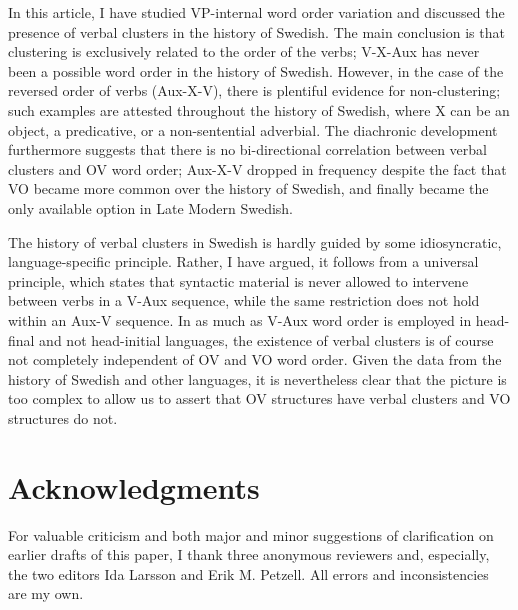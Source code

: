 \documentclass[output=paper, colorlinks, citecolor=brown]{langscibook}
\begin{document}
In this article, I have studied VP-internal word order variation and discussed the presence of verbal clusters in the history of Swedish. The main conclusion is that clustering is exclusively related to the order of the verbs; V-X-Aux has never been a possible word order in the history of Swedish. However, in the case of the reversed order of verbs (Aux-X-V), there is plentiful evidence for non-clustering; such examples are attested throughout the history of Swedish, where X can be an object, a predicative, or a non-sentential adverbial. The diachronic development furthermore suggests that there is no bi-directional correlation between verbal clusters and OV word order; Aux-X-V dropped in frequency despite the fact that VO became more common over the history of Swedish, and finally became the only available option in Late Modern Swedish.


The history of verbal clusters in Swedish is hardly guided by some idiosyncratic, language-specific principle. Rather, I have argued, it follows from a universal principle, which states that syntactic material is never allowed to intervene between verbs in a V-Aux sequence, while the same restriction does not hold within an Aux-V sequence. In as much as V-Aux word order is employed in head-final and not head-initial languages, the existence of verbal clusters is of course not completely independent of OV and VO word order. Given the data from the history of Swedish and other languages, it is nevertheless clear that the picture is too complex to allow us to assert that OV structures have verbal clusters and VO structures do not.


\section*{Acknowledgments}


For valuable criticism and both major and minor suggestions of clarification on earlier drafts of this paper, I thank three anonymous reviewers and, especially, the two editors Ida Larsson and Erik M. Petzell. All errors and inconsistencies are my own.
\end{document}
